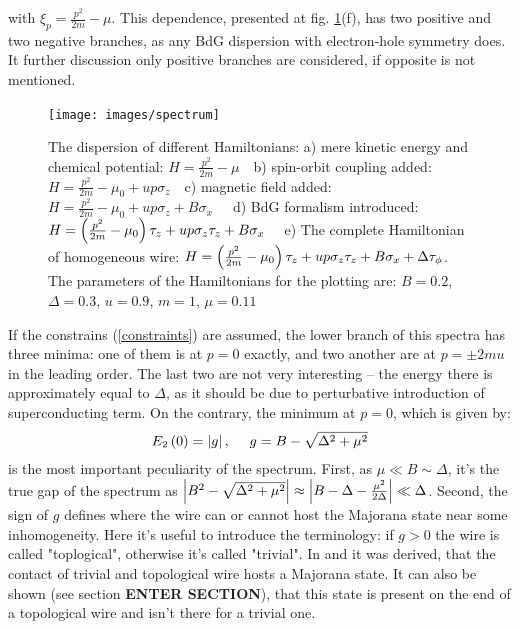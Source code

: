 with $ \xi_p =\frac{p^2}{2m}-\mu$. This dependence, presented at fig. \ref{fig:spectrum}(f), has two positive and two negative branches, as any BdG dispersion with electron-hole symmetry does. It further discussion only positive branches are considered, if opposite is not mentioned.

\begin{figure}[H]
	\centering
	\texttt{[image: images/spectrum]}
	\caption{The dispersion of different Hamiltonians:
		 a)  mere kinetic energy and chemical potential: $ H =\frac{ p^2}{2m} - \mu ~~~$
		 b) spin-orbit coupling added: $ 	H = \frac{p^2}{2m}-\mu_0 + u p \sigma_z ~~~$
		 c) magnetic field added: $ 	H = \frac{p^2}{2m} 	-\mu_0  +u p \sigma_z  + B\sigma_x ~~~~~$
		 d) BdG formalism introduced: $ 	H = \left(\frac{p^2}{2m} 	-\mu_0 \right)\tau_z +u p \sigma_z \tau_z + B\sigma_x	~~~ $
		 e) The complete Hamiltonian of homogeneous wire: $ 	H = \left(\frac{p^2}{2m} 	-\mu_0 \right)\tau_z +u p \sigma_z \tau_z + B\sigma_x	+ \Delta\tau_\phi $.
		 The parameters of the Hamiltonians for the plotting are: $ B=0.2 $, $ \Delta=0.3 $, $ u=0.9 $, $ m = 1 $, $ \mu = 0.11 $ 
 }
	\label{fig:spectrum}
\end{figure}

If the constrains (\ref{constraints}) are assumed, the lower branch of this spectra has three minima: one of them is at $ p=0 $ exactly, and two another are at $ p = \pm 2mu $ in the leading order. The last two are not very interesting -- the energy there is approximately equal to $ \Delta $, as it should be due to perturbative introduction of superconducting term. On the contrary, the minimum at $ p=0 $, which is given by\cite{Oreg_2010}:
\begin{gather}
	E_2\left(0\right)=\left|g\right|,~~~~g = B -\sqrt{\Delta^2+\mu^2}
\end{gather}
is the most important peculiarity of the spectrum. First, as $\mu\ll B \sim \Delta $, it's the true gap of the spectrum as $  \left|B^2 -\sqrt{\Delta^2+\mu^2}\right| \approx  \left|B-\Delta -\frac{\mu^2}{2\Delta}\right|\ll\Delta$. Second, the  sign of  $ g $ defines where the wire can or cannot host the Majorana state near some inhomogeneity. Here it's useful to introduce the terminology: if $ g>0 $ the wire is called "toplogical", otherwise it's called "trivial". In \cite{Oreg_2010} and \cite{Lutchyn_2010} it was derived, that the contact of trivial and topological wire hosts a Majorana state. It can also be shown (see section \textbf{ENTER SECTION}), that this state is present on the end of a topological wire and isn't there for a trivial one.

